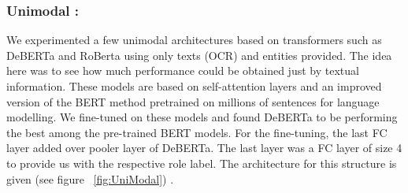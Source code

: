 \documentclass[11pt]{article}
\begin{document}
\subsubsection{Unimodal :}
We experimented a few unimodal architectures based on transformers  \cite{vaswani2017attention} such as DeBERTa  and RoBerta \cite{liu2019roberta} using only texts (OCR) and entities provided. The idea here was to see how much performance could be obtained just by textual information. These models are based on self-attention layers and an improved version of the BERT method pretrained on millions of sentences \cite{devlin2018bert} for language modelling. We fine-tuned on these models and found DeBERTa to be performing the best among the pre-trained BERT models. For the fine-tuning, the last FC layer added over pooler layer of DeBERTa. The last layer was a FC layer of size 4 to provide us with the respective role label. The architecture for this structure is given (see figure ~\ref{fig:UniModal}) . 
\end{document}
